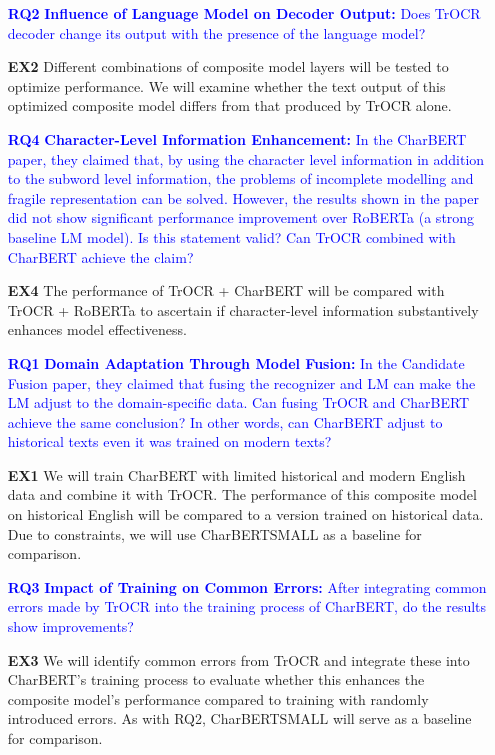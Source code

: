 \begin{itemize}
    \item[\textcolor{Blue}{\textbf{RQ2}}] \textcolor{Blue}{\textbf{Influence of Language Model on Decoder Output: }Does TrOCR decoder change its output with the presence of the language model?}
    \item[\textbf{EX2}] Different combinations of composite model layers will be tested to optimize performance. We will examine whether the text output of this optimized composite model differs from that produced by TrOCR alone.
    \vspace{7mm}
    \item[\textcolor{Blue}{\textbf{RQ4}}] \textcolor{Blue}{\textbf{Character-Level Information Enhancement: }In the CharBERT paper, they claimed that, by using the character level information in addition to the subword level information, the problems of incomplete modelling and fragile representation can be solved. However, the results shown in the paper did not show significant performance improvement over RoBERTa (a strong baseline LM model). Is this statement valid? Can TrOCR combined with CharBERT achieve the claim?}
    \item[\textbf{EX4}] The performance of TrOCR + CharBERT will be compared with TrOCR + RoBERTa to ascertain if character-level information substantively enhances model effectiveness.
    \vspace{7mm}\item[\textcolor{Blue}{\textbf{RQ1}}] \textcolor{Blue}{\textbf{Domain Adaptation Through Model Fusion: }In the Candidate Fusion paper, they claimed that fusing the recognizer and LM can make the LM adjust to the domain-specific data. Can fusing TrOCR and CharBERT achieve the same conclusion? In other words, can CharBERT adjust to historical texts even it was trained on modern texts?}
    \item[\textbf{EX1}] We will train CharBERT with limited historical and modern English data and combine it with TrOCR. The performance of this composite model on historical English will be compared to a version trained on historical data. Due to constraints, we will use CharBERT${\text{SMALL}}$ as a baseline for comparison.
    \vspace{7mm}
    \item[\textcolor{Blue}{\textbf{RQ3}}] \textcolor{Blue}{\textbf{Impact of Training on Common Errors:} After integrating common errors made by TrOCR into the training process of CharBERT, do the results show improvements? }
    \item[\textbf{EX3}] We will identify common errors from TrOCR and integrate these into CharBERT's training process to evaluate whether this enhances the composite model's performance compared to training with randomly introduced errors. As with RQ2, CharBERT${\text{SMALL}}$ will serve as a baseline for comparison.
\end{itemize}

